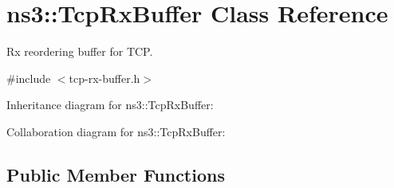\hypertarget{classns3_1_1TcpRxBuffer}{}\section{ns3\+:\+:Tcp\+Rx\+Buffer Class Reference}
\label{classns3_1_1TcpRxBuffer}


Rx reordering buffer for T\+CP.  




{\ttfamily \#include $<$tcp-\/rx-\/buffer.\+h$>$}



Inheritance diagram for ns3\+:\+:Tcp\+Rx\+Buffer\+:


Collaboration diagram for ns3\+:\+:Tcp\+Rx\+Buffer\+:
\subsection*{Public Member Functions}
